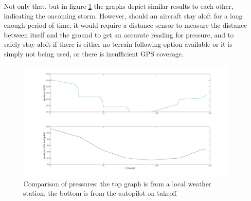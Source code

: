 \documentclass[12pt]{report}
\begin{document}
Not only that, but in figure \ref{fig:pressure_compare} the graphs depict similar results to each other, indicating the oncoming storm. However, should an aircraft stay aloft for a long enough period of time, it would require a distance sensor to measure the distance between itself and the ground to get an accurate reading for pressure, and to safely stay aloft if there is either no terrain following option available or it is simply not being used, or there is insufficient GPS coverage.
\begin{figure}[!ht]
	\centering
	\includegraphics[scale=0.2]{Pressure_from_AP.jpg}
	\caption{Comparison of pressures: the top graph is from a local weather station, the bottom is from the autopilot on takeoff}
	\label{fig:pressure_compare}
\end{figure}


\clearpage
\end{document}
